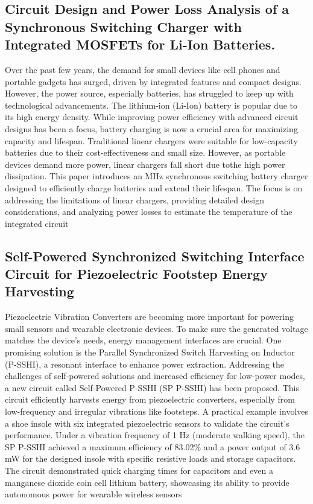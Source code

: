 \documentclass[11pt]{report}	%
\begin{document}
\subsection{Circuit Design and Power Loss Analysis of a Synchronous Switching Charger with Integrated MOSFETs for Li-Ion Batteries.}
Over the past few years, the demand for small devices like cell phones and portable gadgets has surged, driven by integrated features and compact designs. However, the power source, especially batteries, has struggled to keep up with technological advancements. The lithium-ion (Li-Ion) battery is popular due to its high energy density. While improving power efficiency with advanced circuit designs has been a focus, battery charging is now a crucial area for maximizing capacity and lifespan.
Traditional linear chargers were suitable for low-capacity batteries due to their cost-effectiveness and small size. However, as portable devices demand more power, linear chargers fall short due tothe high power dissipation. This paper introduces an MHz synchronous switching battery charger designed to efficiently charge batteries and extend their lifespan. The focus is on addressing the limitations of linear chargers, providing detailed design considerations, and analyzing power losses to estimate the temperature of the integrated circuit

\subsection{Self-Powered Synchronized Switching Interface Circuit for Piezoelectric Footstep Energy Harvesting}
Piezoelectric Vibration Converters are becoming more important for powering small sensors and wearable electronic devices. To make sure the generated voltage matches the device's needs, energy management interfaces are crucial. One promising solution is the Parallel Synchronized Switch Harvesting on Inductor (P-SSHI), a resonant interface to enhance power extraction.
Addressing the challenges of self-powered solutions and increased efficiency for low-power modes, a new circuit called Self-Powered P-SSHI (SP P-SSHI) has been proposed. This circuit efficiently harvests energy from piezoelectric converters, especially from low-frequency and irregular vibrations like footsteps. A practical example involves a shoe insole with six integrated piezoelectric sensors to validate the circuit's performance.
Under a vibration frequency of 1 Hz (moderate walking speed), the SP P-SSHI achieved a maximum efficiency of 83.02\% and a power output of 3.6 mW for the designed insole with specific resistive loads and storage capacitors. The circuit demonstrated quick charging times for capacitors and even a manganese dioxide coin cell lithium battery, showcasing its ability to provide autonomous power for wearable wireless sensors
\end{document}
